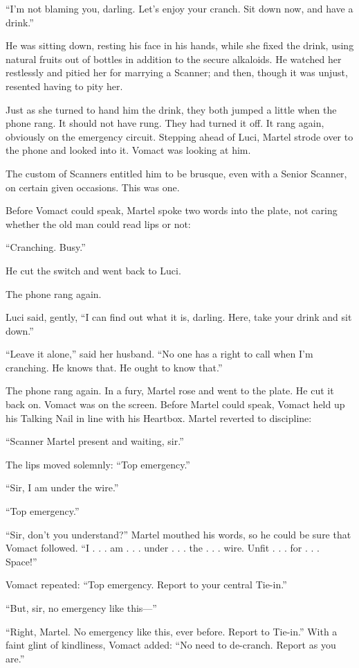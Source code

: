 ``I'm not blaming you, darling. Let's enjoy your cranch. Sit down now, and have a drink.''

He was sitting down, resting his face in his hands, while she fixed the drink, using natural fruits out of bottles in addition to the secure alkaloids. He watched her restlessly and pitied her for marrying a Scanner; and then, though it was unjust, resented having to pity her.

Just as she turned to hand him the drink, they both jumped a little when the phone rang. It should not have rung. They had turned it off. It rang again, obviously on the emergency circuit. Stepping ahead of Luci, Martel strode over to the phone and looked into it. Vomact was looking at him.

The custom of Scanners entitled him to be brusque, even with a Senior Scanner, on certain given occasions. This was one.

Before Vomact could speak, Martel spoke two words into the plate, not caring whether the old man could read lips or not:

``Cranching. Busy.''

He cut the switch and went back to Luci.

The phone rang again.

Luci said, gently, ``I can find out what it is, darling. Here, take your drink and sit down.''

``Leave it alone,'' said her husband. ``No one has a right to call when I'm cranching. He knows that. He ought to know that.''

The phone rang again. In a fury, Martel rose and went to the plate. He cut it back on. Vomact was on the screen. Before Martel could speak, Vomact held up his Talking Nail in line with his Heartbox. Martel reverted to discipline:

``Scanner Martel present and waiting, sir.''

The lips moved solemnly: ``Top emergency.''

``Sir, I am under the wire.''

``Top emergency.''

``Sir, don't you understand?'' Martel mouthed his words, so he could be sure that Vomact followed. ``I . . . am . . . under . . . the . . . wire. Unfit . . . for . . . Space!''

Vomact repeated: ``Top emergency. Report to your central Tie-in.''

``But, sir, no emergency like this---''

``Right, Martel. No emergency like this, ever before. Report to Tie-in.'' With a faint glint of kindliness, Vomact added: ``No need to de-cranch. Report as you are.''

